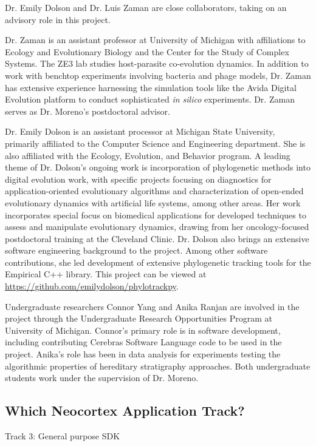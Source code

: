 Dr. Emily Dolson and Dr. Luis Zaman are close collaborators, taking on an advisory role in this project.

Dr. Zaman is an assistant professor at University of Michigan with affiliations to Ecology and Evolutionary Biology and the Center for the Study of Complex Systems.
The ZE3 lab studies host-parasite co-evolution dynamics.
In addition to work with benchtop experiments involving bacteria and phage models, Dr. Zaman has extensive experience harnessing the simulation tools like the Avida Digital Evolution platform to conduct sophisticated \textit{in silico} experiments.
Dr. Zaman serves as Dr. Moreno's postdoctoral advisor.

Dr. Emily Dolson is an assistant processor at Michigan State University, primarily affiliated to the Computer Science and Engineering department.
She is also affiliated with the Ecology, Evolution, and Behavior program.
A leading theme of Dr. Dolson's ongoing work is incorporation of phylogenetic methods into digital evolution work, with specific projects focusing on diagnostics for application-oriented evolutionary algorithms and characterization of open-ended evolutionary dynamics with artificial life systems, among other areas.
Her work incorporates special focus on biomedical applications for developed techniques to assess and manipulate evolutionary dynamics, drawing from her oncology-focused postdoctoral training at the Cleveland Clinic.
Dr. Dolson also brings an extensive software engineering background to the project.
Among other software contributions, she led development of extensive phylogenetic tracking tools for the Empirical C++ library.
This project can be viewed at \url{https://github.com/emilydolson/phylotrackpy}.

Undergraduate researchers Connor Yang and Anika Ranjan are involved in the project through the Undergraduate Research Opportunities Program at University of Michigan.
Connor's primary role is in software development, including contributing Cerebras Software Language code to be used in the project.
Anika's role has been in data analysis for experiments testing the algorithmic properties of hereditary stratigraphy approaches.
Both undergraduate students work under the supervision of Dr. Moreno.

\subsection{Which Neocortex Application Track?}

Track 3: General purpose SDK

